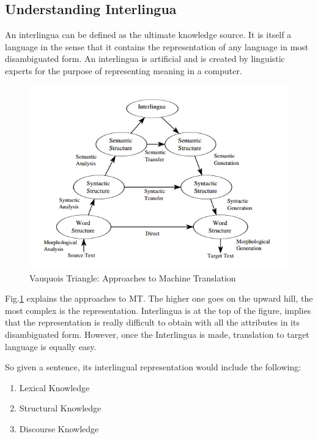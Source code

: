     \subsection{Understanding Interlingua}
    An interlingua can be defined as the ultimate knowledge source. It is itself a language in the sense that it contains the representation of any language in most disambiguated form. An interlingua is artificial and is created by linguistic experts for the purpose of representing meaning in a computer. 
    \begin{figure}
        \centering
        \includegraphics[scale=0.6]{Images/interlingua.png}
        \caption{Vauquois Triangle: Approaches to Machine Translation}
        \label{fig:triangle}
    \end{figure}
    
    Fig.\ref{fig:triangle}\cite{dorr} explains the approaches to MT. The higher one goes on the upward hill, the most complex is the representation. Interlingua is at the top of the figure, implies that the representation is really difficult to obtain with all the attributes in its disambiguated form. However, once the Interlingua is made, translation to target language is equally easy.
    
    So given a sentence, its interlingual representation would include the following\cite{bhattacharyya}:
    \begin{enumerate}
        \item Lexical Knowledge
        \item Structural Knowledge
        \item Discourse Knowledge
    \end{enumerate}
    
